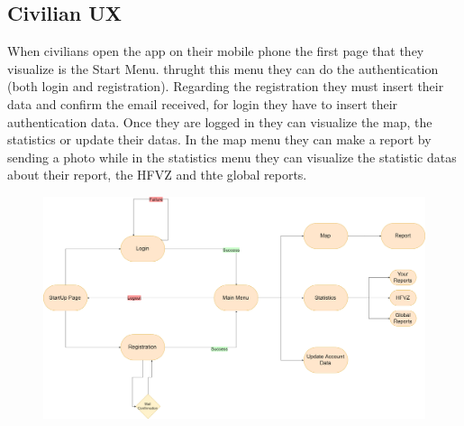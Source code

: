 \documentclass[12pt,a4paper]{article}
\begin{document}
\subsection{Civilian UX}
When civilians open the app on their mobile phone the first page that they visualize is the Start Menu. thrught this menu they can do the authentication (both login and registration).
Regarding the registration they must insert their data and confirm the email received, for login they have to insert their authentication data. Once they are logged in they can visualize the map, the statistics or update their datas. In the map menu they can make a report by sending a photo while in the statistics menu they can visualize the statistic datas about their report, the HFVZ and thte global reports.
\begin{figure}[H]
		\centering
			\includegraphics[width=1.0\linewidth]{Images/UX/CivilianUX}
\end{figure}
\end{document}
